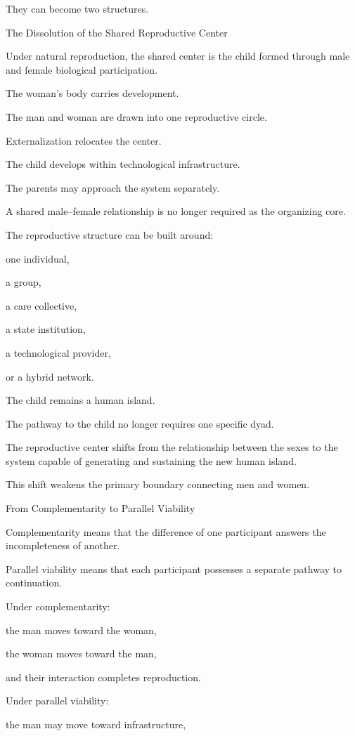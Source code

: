 They can become two structures.

The Dissolution of the Shared Reproductive Center

Under natural reproduction, the shared center is the child formed through male and female biological participation.

The woman’s body carries development.

The man and woman are drawn into one reproductive circle.

Externalization relocates the center.

The child develops within technological infrastructure.

The parents may approach the system separately.

A shared male–female relationship is no longer required as the organizing core.

The reproductive structure can be built around:

one individual,

a group,

a care collective,

a state institution,

a technological provider,

or a hybrid network.

The child remains a human island.

The pathway to the child no longer requires one specific dyad.

The reproductive center shifts from the relationship between the sexes to the system capable of generating and sustaining the new human island.

This shift weakens the primary boundary connecting men and women.

From Complementarity to Parallel Viability

Complementarity means that the difference of one participant answers the incompleteness of another.

Parallel viability means that each participant possesses a separate pathway to continuation.

Under complementarity:

the man moves toward the woman,

the woman moves toward the man,

and their interaction completes reproduction.

Under parallel viability:

the man may move toward infrastructure,

